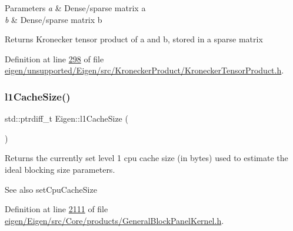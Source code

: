\begin{DoxyParams}{Parameters}
{\em a} & Dense/sparse matrix a \\
\hline
{\em b} & Dense/sparse matrix b \\
\hline
\end{DoxyParams}
\begin{DoxyReturn}{Returns}
Kronecker tensor product of a and b, stored in a sparse matrix 
\end{DoxyReturn}


Definition at line \hyperlink{eigen_2unsupported_2_eigen_2src_2_kronecker_product_2_kronecker_tensor_product_8h_source_l00298}{298} of file \hyperlink{eigen_2unsupported_2_eigen_2src_2_kronecker_product_2_kronecker_tensor_product_8h_source}{eigen/unsupported/\+Eigen/src/\+Kronecker\+Product/\+Kronecker\+Tensor\+Product.\+h}.

\mbox{\label{namespace_eigen_a2669f89ff38296a38e6d973552eb4e33}} 
\subsubsection{\texorpdfstring{l1\+Cache\+Size()}{l1CacheSize()}}
{\footnotesize\ttfamily std\+::ptrdiff\+\_\+t Eigen\+::l1\+Cache\+Size (\begin{DoxyParamCaption}{ }\end{DoxyParamCaption})\hspace{0.3cm}{\ttfamily [inline]}}

\begin{DoxyReturn}{Returns}
the currently set level 1 cpu cache size (in bytes) used to estimate the ideal blocking size parameters. 
\end{DoxyReturn}
\begin{DoxySeeAlso}{See also}
set\+Cpu\+Cache\+Size 
\end{DoxySeeAlso}


Definition at line \hyperlink{eigen_2_eigen_2src_2_core_2products_2_general_block_panel_kernel_8h_source_l02111}{2111} of file \hyperlink{eigen_2_eigen_2src_2_core_2products_2_general_block_panel_kernel_8h_source}{eigen/\+Eigen/src/\+Core/products/\+General\+Block\+Panel\+Kernel.\+h}.

\mbox{\label{namespace_eigen_a2cfc0330ba567d63a496be1cac8427ae}} 
